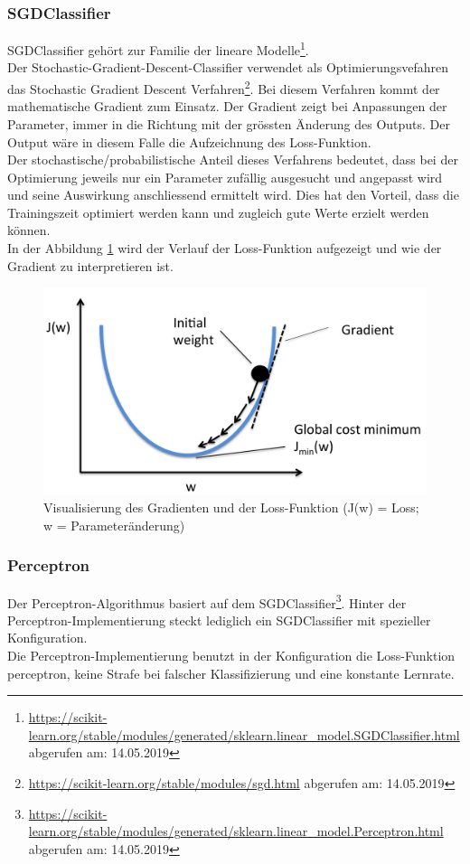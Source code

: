 \subsubsection{SGDClassifier}
SGDClassifier gehört zur Familie der lineare Modelle\footnote{\url{https://scikit-learn.org/stable/modules/generated/sklearn.linear_model.SGDClassifier.html} abgerufen am: 14.05.2019}\cite{scikit-learn}.\\
Der \glqq Stochastic-Gradient-Descent-Classifier\grqq{} verwendet als Optimierungsvefahren das \glqq Stochastic Gradient Descent\grqq{} Verfahren\footnote{\url{https://scikit-learn.org/stable/modules/sgd.html} abgerufen am: 14.05.2019}.
Bei diesem Verfahren kommt der mathematische Gradient zum Einsatz.
Der Gradient zeigt bei Anpassungen der Parameter, immer in die Richtung mit der grössten Änderung des Outputs.
Der Output wäre in diesem Falle die Aufzeichnung des Loss-Funktion.\\
Der stochastische/probabilistische Anteil dieses Verfahrens bedeutet, dass bei der Optimierung jeweils nur ein Parameter zufällig ausgesucht und angepasst wird und seine Auswirkung anschliessend ermittelt wird.
Dies hat den Vorteil, dass die Trainingszeit optimiert werden kann und zugleich gute Werte erzielt werden können\cite{lecun2012efficient}.\\
In der Abbildung \cref{fig:sgd} wird der Verlauf der Loss-Funktion aufgezeigt und wie der Gradient zu interpretieren ist.
\begin{figure}[H]	
	\includegraphics[width=0.7\columnwidth,keepaspectratio]{img/sgd.png}
	\caption{Visualisierung des Gradienten und der Loss-Funktion (J(w) = Loss; w = Parameteränderung)}
	\label{fig:sgd}
\end{figure}
\subsubsection{Perceptron}
Der Perceptron-Algorithmus basiert auf dem SGDClassifier\footnote{\url{https://scikit-learn.org/stable/modules/generated/sklearn.linear_model.Perceptron.html} abgerufen am: 14.05.2019}\cite{scikit-learn}.
Hinter der Perceptron-Implementierung steckt lediglich ein SGDClassifier mit spezieller Konfiguration.\\
Die Perceptron-Implementierung benutzt in der Konfiguration die Loss-Funktion \glqq perceptron\grqq{}, keine Strafe bei falscher Klassifizierung und eine konstante Lernrate.
